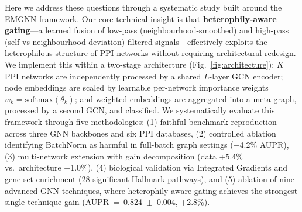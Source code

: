 Here we address these questions through a systematic study built around the
EMGNN framework. Our core technical insight is that \textbf{heterophily-aware
gating}---a learned fusion of low-pass (neighbourhood-smoothed) and high-pass
(self-vs-neighbourhood deviation) filtered signals---effectively exploits the
heterophilous structure of PPI networks without requiring architectural redesign.
We implement this within a two-stage architecture (Fig.~\ref{fig:architecture}):
$K$ PPI networks are independently processed by a shared $L$-layer GCN encoder;
node embeddings are scaled by learnable per-network importance weights
$w_k = \mathrm{softmax}(\theta_k)$; and weighted embeddings are aggregated into
a meta-graph, processed by a second GCN, and classified. We systematically
evaluate this framework through five methodologies: (1) faithful benchmark
reproduction across three GNN backbones and six PPI databases, (2) controlled
ablation identifying BatchNorm as harmful in full-batch graph settings
($-$4.2\% AUPR), (3) multi-network extension with gain decomposition
(data +5.4\% vs.\ architecture +1.0\%), (4) biological validation via Integrated
Gradients and gene set enrichment (28 significant Hallmark pathways), and
(5) ablation of nine advanced GNN techniques, where heterophily-aware gating
achieves the strongest single-technique gain (AUPR~=~0.824~$\pm$~0.004, +2.8\%).
